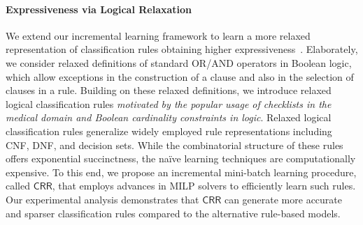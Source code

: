 \documentclass[11pt]{article}
\begin{document}
	\paragraph{Expressiveness via Logical Relaxation}
	We extend our incremental learning framework to learn a more relaxed representation of classification rules obtaining higher expressiveness~\cite{ghosh2020classification}. Elaborately, we consider relaxed definitions of standard OR/AND operators in Boolean logic, which allow exceptions in the construction of a clause and also in the selection of clauses in a rule. Building on these relaxed definitions, we introduce relaxed logical classification rules \textit{motivated by the popular usage of checklists in the medical domain and Boolean cardinality constraints in logic}. Relaxed logical classification rules generalize widely employed rule representations including CNF, DNF, and decision sets. While the combinatorial structure of these rules offers exponential succinctness, the na\"ive learning techniques are computationally expensive. To this end, we propose an incremental mini-batch learning procedure, called $ \mathsf{CRR} $, that employs advances in MILP solvers to efficiently learn such rules. Our experimental analysis demonstrates that $ \mathsf{CRR} $ can generate  more accurate and sparser classification rules compared to the alternative rule-based models.
	
	
	
	
	
\end{document}
